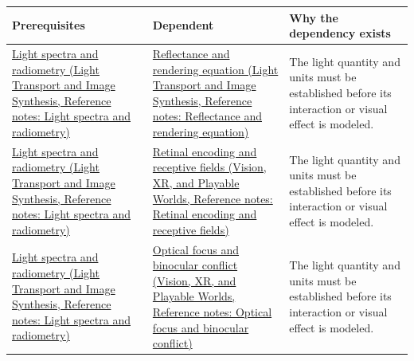 {\def\LTcaptype{none} %
\begin{longtable}[]{@{}
  >{\raggedright\arraybackslash}p{}
  >{\raggedright\arraybackslash}p{}
  >{\raggedright\arraybackslash}p{}@{}}
\toprule\noalign{}
\begin{minipage}[b]{\linewidth}\raggedright
Prerequisites
\end{minipage} & \begin{minipage}[b]{\linewidth}\raggedright
Dependent
\end{minipage} & \begin{minipage}[b]{\linewidth}\raggedright
Why the dependency exists
\end{minipage} \\
\midrule\noalign{}
\endhead
\bottomrule\noalign{}
\endlastfoot
\href{../04-Light-Transport-and-Image-Synthesis/main.pdf\#nameddest=appendix-215c2570199b}{Light spectra and radiometry (Light Transport and Image Synthesis, Reference notes: Light spectra and radiometry)} & \href{../04-Light-Transport-and-Image-Synthesis/main.pdf\#nameddest=appendix-96da0b153b77}{Reflectance and rendering equation (Light Transport and Image Synthesis, Reference notes: Reflectance and rendering equation)} & The light quantity and units must be established before its interaction or visual effect is modeled. \\
\href{../04-Light-Transport-and-Image-Synthesis/main.pdf\#nameddest=appendix-215c2570199b}{Light spectra and radiometry (Light Transport and Image Synthesis, Reference notes: Light spectra and radiometry)} & \href{../07-Vision-XR-and-Playable-Worlds/main.pdf\#nameddest=appendix-7281c15ac44a}{Retinal encoding and receptive fields (Vision, XR, and Playable Worlds, Reference notes: Retinal encoding and receptive fields)} & The light quantity and units must be established before its interaction or visual effect is modeled. \\
\href{../04-Light-Transport-and-Image-Synthesis/main.pdf\#nameddest=appendix-215c2570199b}{Light spectra and radiometry (Light Transport and Image Synthesis, Reference notes: Light spectra and radiometry)} & \href{../07-Vision-XR-and-Playable-Worlds/main.pdf\#nameddest=appendix-f90cee1be7a4}{Optical focus and binocular conflict (Vision, XR, and Playable Worlds, Reference notes: Optical focus and binocular conflict)} & The light quantity and units must be established before its interaction or visual effect is modeled. \\

\end{longtable}}
